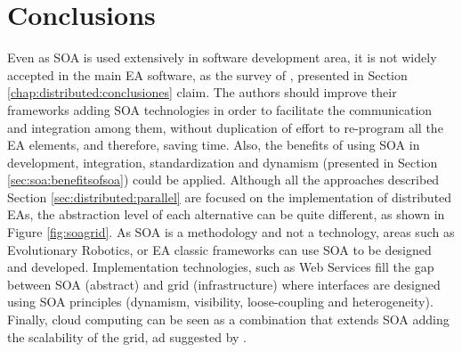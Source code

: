 \section{Conclusions}

Even as SOA is used extensively in software development area, it is
not widely accepted in the main EA software, as the survey of , presented in Section \ref{chap:distributed:conclusiones} claim. %
The authors should improve their frameworks adding SOA technologies in
order to facilitate the communication and integration among them, without
 duplication of effort to re-program all the EA elements, and therefore, saving time. 
 Also, the benefits of using SOA in development, integration, standardization 
 and dynamism (presented in Section \ref{sec:soa:benefitsofsoa}) could be applied.
 Although all the approaches described Section \ref{sec:distributed:parallel} are focused
 on the implementation of distributed EAs, the abstraction level of
 each alternative can be quite different, as shown in Figure
 \ref{fig:soagrid}.  As SOA is a methodology and not a technology,
 areas such as Evolutionary Robotics, or EA classic frameworks can use
 SOA to be designed and developed. Implementation technologies, such
 as Web Services fill the gap between SOA (abstract) and grid
 (infrastructure) where interfaces are designed using SOA principles
 (dynamism, visibility, loose-coupling and heterogeneity). Finally,
 cloud computing can be seen as a combination that extends SOA adding
 the scalability of the grid, ad suggested by 
 \cite{SOALIB}. %


